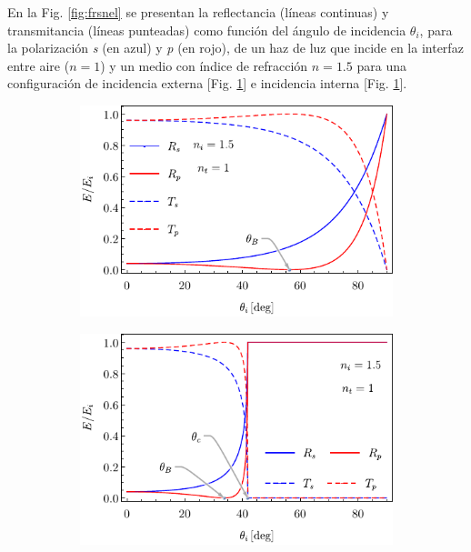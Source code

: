 En la Fig. \ref{fig:frsnel} se presentan la reflectancia (líneas continuas) y transmitancia (líneas punteadas) como función del ángulo de incidencia $\theta_i$, para la polarización \emph{s} (en azul) y \emph{p} (en rojo), de un haz de luz que incide en la interfaz entre aire ($n=1$) y un medio con índice de refracción $n=1.5$ para una configuración de incidencia externa [Fig. \ref{sfig:frsnelExt}] e incidencia interna [Fig. \ref{sfig:frsnelExt}].
%
\begin{figure}[h!]\centering
	\begin{subfigure}{.05\textwidth}\vspace{-4.75cm}\caption{}\label{sfig:frsnelExt}\end{subfigure}
	\begin{subfigure}{.43\textwidth} \hspace*{-1cm}
	\includegraphics[scale=1,trim={00 00 00 00}, clip]{1-Teoria/figs/0-FrsnelExt}
	\end{subfigure}
	\begin{subfigure}{.05\textwidth}\vspace{-4.75cm}\caption{}\label{sfig:frsenlInt}\end{subfigure}
	\begin{subfigure}{.43\textwidth} \hspace*{-.9cm}
	\includegraphics[scale=1,trim={00 00 00 00 }, clip]{1-Teoria/figs/0-FrsnelInt}

\end{subfigure}
\end{figure}
